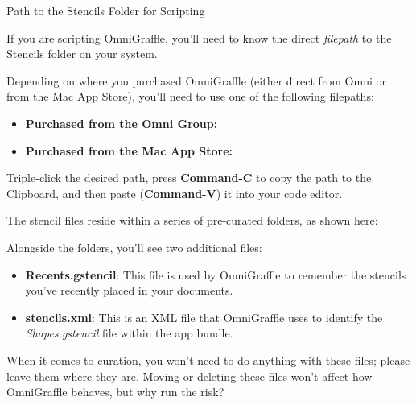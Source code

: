 \documentclass[../main.tex]{subfiles}
\begin{document}
\begin{ogsidebar}
  Path to the Stencils Folder for Scripting

  If you are scripting OmniGraffle, you'll need to know the direct \textit{filepath} to the
  Stencils folder on your system.

  Depending on where you purchased OmniGraffle (either direct from Omni or from the Mac App
  Store), you'll need to use one of the following filepaths:

  \begin{itemize}
    \item \textbf{Purchased from the Omni Group:}

      \noindent\footnotesize{}
    \item \textbf{Purchased from the Mac App Store:}

      \noindent\footnotesize{}
  \end{itemize}

  Triple-click the desired path, press \textbf{Command-C} to copy the path to the Clipboard, and
  then paste (\textbf{Command-V}) it into your code editor.
\end{ogsidebar}

The stencil files reside within a series of pre-curated folders, as shown here:


\begin{ognote}
  Alongside the folders, you'll see two additional files:

  \begin{itemize}
    \item \textbf{Recents.gstencil}: This file is used by OmniGraffle to remember the stencils
      you've recently placed in your documents.
    \item \textbf{stencils.xml}: This is an XML file that OmniGraffle uses to identify the
      \textit{Shapes.gstencil} file within the app bundle.
  \end{itemize}

  When it comes to curation, you won't need to do anything with these files; please leave them
  where they are. Moving or deleting these files won't affect how OmniGraffle behaves, but why
  run the risk?
\end{ognote}
\end{document}
